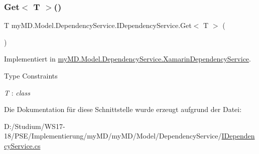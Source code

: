 \subsubsection{\texorpdfstring{Get$<$ T $>$()}{Get< T >()}}
{\footnotesize\ttfamily T my\+M\+D.\+Model.\+Dependency\+Service.\+I\+Dependency\+Service.\+Get$<$ T $>$ (\begin{DoxyParamCaption}{ }\end{DoxyParamCaption})}



Implementiert in \mbox{\hyperlink{classmy_m_d_1_1_model_1_1_dependency_service_1_1_xamarin_dependency_service_a45858cd78923d949421471c9cc4d30be}{my\+M\+D.\+Model.\+Dependency\+Service.\+Xamarin\+Dependency\+Service}}.

\begin{Desc}
\item[Type Constraints]\begin{description}
\item[{\em T} : {\em class}]\end{description}
\end{Desc}


Die Dokumentation für diese Schnittstelle wurde erzeugt aufgrund der Datei\+:\begin{DoxyCompactItemize}
\item 
D\+:/\+Studium/\+W\+S17-\/18/\+P\+S\+E/\+Implementierung/my\+M\+D/my\+M\+D/\+Model/\+Dependency\+Service/\mbox{\hyperlink{_i_dependency_service_8cs}{I\+Dependency\+Service.\+cs}}\end{DoxyCompactItemize}
